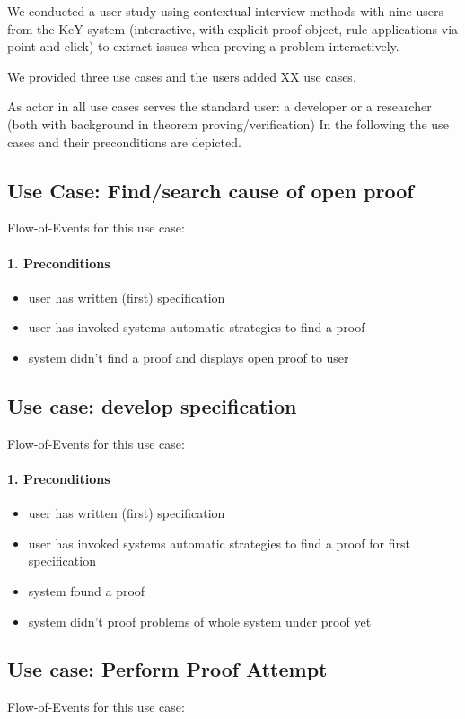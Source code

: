 \documentclass{article}
\begin{document}
We conducted a user study using contextual interview methods with nine users 
from the KeY system (interactive, with explicit proof object, rule applications 
via point and click)
to extract issues when proving a problem interactively.

We provided three use cases and the users added XX use cases.

As actor in all use cases serves the standard user: a developer or a researcher 
(both with background in theorem proving/verification)
In the following the use cases and their preconditions are depicted. 

\subsection{Use Case: Find/search cause of open proof}

Flow-of-Events for this use case:
\paragraph{1. Preconditions}
\begin{itemize}
 \item user has written (first) specification
 \item user has invoked systems automatic strategies to find a proof
 \item system didn't find a proof and displays open proof to user
\end{itemize}



\subsection{Use case: develop specification}
Flow-of-Events for this use case:
\paragraph{1. Preconditions}
\begin{itemize}
 \item user has written (first) specification
 \item user has invoked systems automatic strategies to find a proof for first 
specification
 \item system found a proof 
 \item system didn't proof problems of whole system under proof yet
\end{itemize}

\subsection{Use case: Perform Proof Attempt}
Flow-of-Events for this use case:
\end{document}
